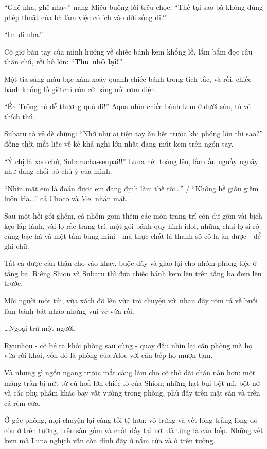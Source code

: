 \documentclass[../main.tex]{subfiles}
\begin{document}
``Ghê nha, ghê nha\~{}'' nàng Miêu buông lời trêu chọc. ``Thế tại sao bà không dùng phép thuật của bà làm việc có ích vào đời sống đi?''

``Im đi nha.''

Cô giơ bàn tay của mình hướng về chiếc bánh kem khổng lồ, lẩm bẩm đọc câu thần chú, rồi hô lớn: ``\textbf{Thu nhỏ lại!}''

Một tia sáng màu bạc xám xoáy quanh chiếc bánh trong tích tắc, và rồi, chiếc bánh khổng lồ giờ chỉ còn cỡ bằng nồi cơm điện.

``Ể\~{} Trông nó dễ thương quá đi!'' Aqua nhìn chiếc bánh kem ở dưới sàn, tỏ vẻ thích thú.

Subaru tỏ vẻ dè chừng: ``Nhỡ như ai tiện tay ăn hết trước khi phóng lớn thì sao?'' đồng thời mắt liếc về kẻ khả nghi lớn nhất đang mút kem trên ngón tay.

``Ý chị là xao chứ, Subarucha-senpai!!'' Luna hét toáng lên, lắc đầu nguầy nguậy như đang chối bỏ chủ ý của mình.

``Nhìn mặt em là đoán được em đang định làm thế rồi\dots'' / ``Không hề giấu giếm luôn kìa\dots'' cả Choco và Mel nhăn mặt.

Sau một hồi gói ghém, cả nhóm gom thêm các món trang trí còn dư gồm vài bịch kẹo lấp lánh, vài lọ rắc trang trí, một gói bánh quy hình idol, những chai lọ si-rô cùng bạc hà và một tấm bảng mini - mà thực chất là thanh sô-cô-la ăn được - để ghi chữ.

Tất cả được cẩn thận cho vào khay, buộc dây và giao lại cho nhóm phòng tiệc ở tầng ba. Riêng Shion và Subaru thì đưa chiếc bánh kem lên trên tầng ba đem lên trước.

Mỗi người một túi, vừa xách đồ lên vừa trò chuyện với nhau đầy rôm rả về buổi làm bánh bát nháo nhưng vui vẻ vừa rồi.

\dots Ngoại trừ một người.

Ryuuhou - cô bé ra khỏi phòng sau cùng - quay đầu nhìn lại căn phòng mà họ vừa rời khỏi, vốn đó là phòng của Aloe với căn bếp họ mượn tạm.

Và những gì ngổn ngang trước mắt càng làm cho cô thở dài chán nản hơn: một mảng trần bị nứt từ cú hoắ lớn chiếc lò của Shion; những hạt bụi bột mì, bột nở và các phụ phẩm khác bay vất vưởng trong phòng, phủ đầy trên mặt sàn và trên cả rèm cửa.

Ở góc phòng, mọi chuyện lại càng tồi tệ hơn: vỏ trứng và vết lòng trắng lòng đỏ còn ở trên tường, trên sàn gốm và chất đầy tại nơi đã từng là căn bếp. Những vết kem mà Luna nghịch vẫn còn dính đầy ở nắm cửa và ở trên tường.
\end{document}
